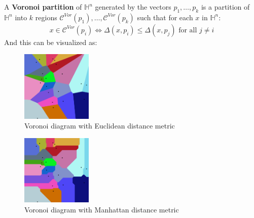 A \textbf{Voronoi partition} of $\mathbb{H}^n$ generated by the vectors $p_1, \dots, p_k$ is a partition of $\mathbb{H}^n$ into $k$ regions $\mathcal{C}^{Vor}(p_1), \dots, \mathcal{C}^{Vor}(p_k)$ such that for each $x$ in $\mathbb{H}^n$:
\[
    x \in \mathcal{C}^{Vor}(p_i) \iff \Delta(x, p_i) \leq \Delta(x, p_j) \text{ for all } j \neq i    
\]
And this can be visualized as: 
    \begin{multicols}{2}
        \begin{center}
            \begin{figure}[H]
                \centering
                \includegraphics[width=0.3\textwidth]{./Images/Euclidean_Voronoi_diagram.png}
                \caption{Voronoi diagram with Euclidean distance metric}
            \end{figure}
        \end{center}
        \begin{center}
            \begin{figure}[H]
                \centering
                \includegraphics[width=0.3\textwidth]{./Images/Manhattan_Voronoi_Diagram.png}
                \caption{Voronoi diagram with Manhattan distance metric}
            \end{figure}
        \end{center}
    \end{multicols}



